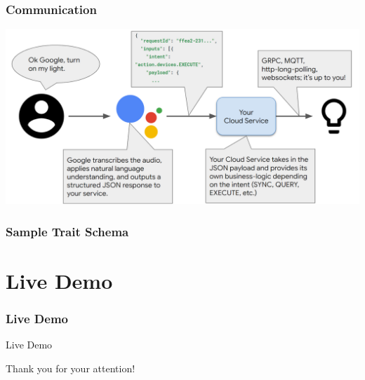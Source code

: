 \documentclass{beamer}
\begin{document}
\begin{frame}
\frametitle{Communication}
\begin{center}
\includegraphics[scale=0.22]{pictures/communication_btw.png}
\end{center}
\end{frame}

\begin{frame}
\frametitle{Sample Trait Schema}
\begin{center}
\end{center}
\end{frame}


\section{Live Demo}

\begin{frame}
\frametitle{Live Demo}
\begin{center}
{\fontsize{30}{40}\selectfont Live Demo}
\end{center}
\end{frame}


\begin{frame}
\begin{center}
{\fontsize{30}{40}\selectfont Thank you for your attention!}
\end{center}
\end{frame}

\end{document}
